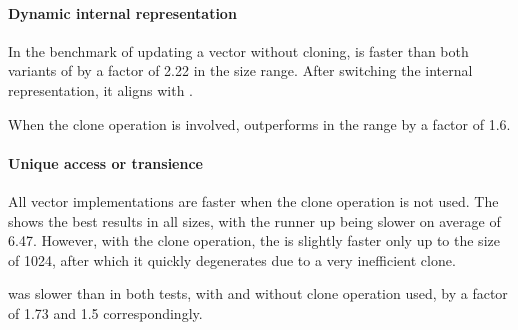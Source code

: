 \paragraph{Dynamic internal representation}
In the benchmark of updating a vector without cloning, \pvec{} is faster than both variants of \rrbvec{} by a factor of 2.22 in the \range{[10, 1024]} size range. After switching the internal representation, it aligns with \rrbvec{}. 

When the clone operation is involved, \pvec{} outperforms \rrbvec{} in the \range{[80, 1024]} range by a factor of 1.6. 

\paragraph{Unique access or transience}
All vector implementations are faster when the clone operation is not used. The \stdvec{} shows the best results in all sizes, with the runner up \pvec{} being slower on average of 6.47. However, with the clone operation, the \stdvec{} is slightly faster only up to the size of 1024, after which it quickly degenerates due to a very inefficient clone. 

\imrsvec{} was slower than \rrbvec{} in both tests, with and without clone operation used, by a factor of 1.73 and 1.5 correspondingly. 

